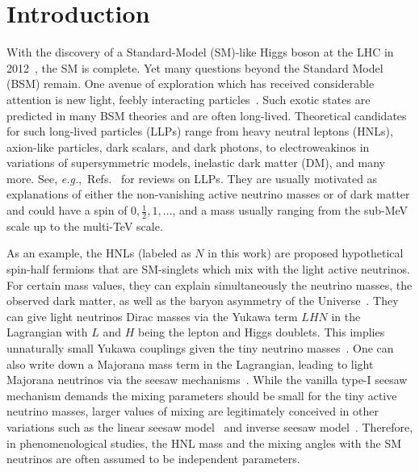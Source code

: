 \section{Introduction}\label{sec:intro}


With the discovery of a Standard-Model (SM)-like Higgs boson at the LHC in 2012~\cite{ATLAS:2012yve,CMS:2012qbp}, the 
SM is complete. Yet many questions beyond the Standard Model (BSM) remain. One avenue of exploration which has
received considerable attention is new light, feebly interacting particles~\cite{Dedes:2001zia, Feng:2014uja, 
Hewett:2014qja, Alexander:2016aln, Battaglieri:2017aum, Alimena:2019zri, Beacham:2019nyx, Arguelles:2019xgp, 
EuropeanStrategyforParticlePhysicsPreparatoryGroup:2019qin, Agrawal:2021dbo}. Such exotic states are predicted in many
BSM theories and are often long-lived. Theoretical candidates for such long-lived particles (LLPs) range from heavy 
neutral leptons (HNLs), axion-like particles, dark scalars, and dark photons, to electroweakinos in variations of 
supersymmetric models, inelastic dark matter (DM), and many more. See, \textit{e.g.},~Refs.~\cite{Alimena:2019zri, 
Lee:2018pag, Curtin:2018mvb, Knapen:2022afb} for reviews on LLPs. They are usually motivated as explanations of either
the non-vanishing active neutrino masses or of dark matter and could have a spin of $0,\frac{1}{2},1,
\ldots$, and a mass usually ranging from the sub-MeV scale up to the multi-TeV scale. 

As an example, the HNLs (labeled as $N$ in this work) are proposed hypothetical spin-half fermions 
that are SM-singlets which mix with the light active neutrinos. For certain mass values, they can explain 
simultaneously the neutrino masses, the observed dark matter, as well as the baryon asymmetry of the 
Universe~\cite{Asaka:2005pn}. They can give light neutrinos Dirac masses via the Yukawa term $LHN$ in the Lagrangian with $L$ and $H$ being the lepton and Higgs doublets.
This implies unnaturally small Yukawa couplings given the tiny neutrino masses~\cite{deSalas:2020pgw, 
Esteban:2020cvm, Capozzi:2021fjo}.
One can also write down a Majorana mass term in the Lagrangian, leading to light Majorana neutrinos via the seesaw mechanisms~\cite{Minkowski:1977sc, Yanagida:1979as, Gell-Mann:1979vob, Mohapatra:1979ia, Schechter:1980gr}.
While the vanilla type-I seesaw mechanism demands the mixing parameters should be small for the tiny active neutrino masses, larger values of mixing are legitimately conceived in other variations such as the linear seesaw model~\cite{Akhmedov:1995ip, Akhmedov:1995vm, Malinsky:2005bi} and inverse seesaw model~\cite{Mohapatra:1986bd, Gonzalez-Garcia:1988okv}.
Therefore, in phenomenological studies, the HNL mass and the mixing angles with the SM neutrinos are often assumed to be independent parameters. 

